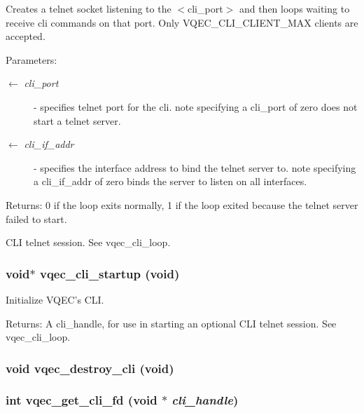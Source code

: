 Creates a telnet socket listening to the $<$cli\_\-port$>$ and then loops waiting to receive cli commands on that port. Only VQEC\_\-CLI\_\-CLIENT\_\-MAX clients are accepted. \begin{Desc}
\item[Parameters:]
\begin{description}
\item[\mbox{$\leftarrow$} {\em cli\_\-port}]- specifies telnet port for the cli. note specifying a cli\_\-port of zero does not start a telnet server. \item[\mbox{$\leftarrow$} {\em cli\_\-if\_\-addr}]- specifies the interface address to bind the telnet server to. note specifying a cli\_\-if\_\-addr of zero binds the server to listen on all interfaces. \end{description}
\end{Desc}
\begin{Desc}
\item[Returns:]0 if the loop exits normally, 1 if the loop exited because the telnet server failed to start.\end{Desc}
CLI telnet session. See vqec\_\-cli\_\-loop. 
\subsubsection{\setlength{\rightskip}{0pt plus 5cm}void$\ast$ vqec\_\-cli\_\-startup (void)}\label{vqec__cli__register_8h_5314b6d20c5f74e68629aad10f432b6b}


Initialize VQEC's CLI. \begin{Desc}
\item[Returns:]A cli\_\-handle, for use in starting an optional CLI telnet session. See vqec\_\-cli\_\-loop. \end{Desc}
\subsubsection{\setlength{\rightskip}{0pt plus 5cm}void vqec\_\-destroy\_\-cli (void)}\label{vqec__cli__register_8h_06fe000a0fdce8ad59626677a22d8ab1}


\subsubsection{\setlength{\rightskip}{0pt plus 5cm}int vqec\_\-get\_\-cli\_\-fd (void $\ast$ {\em cli\_\-handle})}\label{vqec__cli__register_8h_32efc37e7ffb06b897e5ff60087fa796}


